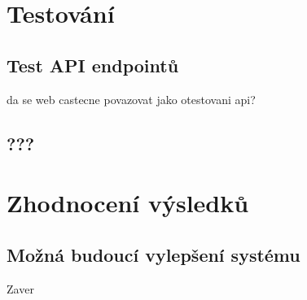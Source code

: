 \documentclass[thesis=B,czech]{FITthesis}[2012/06/26]
\begin{document}
\chapter{Testování}
\section{Test API endpointů}
	da se web castecne povazovat jako otestovani api?
\section{???}

\chapter{Zhodnocení výsledků}
\section{Možná budoucí vylepšení systému}


\begin{conclusion}
	Zaver
\end{conclusion}
\end{document}
